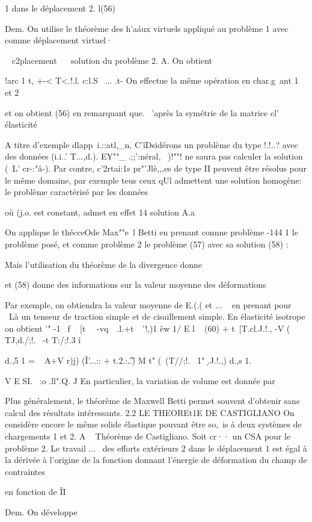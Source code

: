 {{{1 dans le déplacement 2. 
l(56) 


Dem. On utilise le théorème des h'a\'aux virtuels appliqué au problème 1 avec comme déplacement virtuel·}~ c2placement ~~ solution du problème 2. 
A. 
On obtient 

!arc 1 t,
+-< T<.!.l. c:l.S
\ ... .t-
On effectue la même opération en char.g~ant 1 et 2 

et on obtient (56) en remarquant que. ~'après la symétrie de la matrice cl' élasticité 

A titre d'exemple dlapp~i.::atl,_n, C'îDsidérons un problème du type !.!..? avec des données (i.i..' T...,d.). EY""_ .;;':néral, ~)!""! ne saura pas calculer la so­lution (~L' cr-:"â-). Par contre, c'2rtai:1s pr"'Jlè,,,es de type II peuvent être résolus pour le même domaine, par exemple teus ceux qUl admettent une solu­tion homogène: le problème caractérisé par les données 

où (j.o. est constant, admet en effet 14 solution 
A.a 

On applique le thécceO\e de Max""e\ l Betti en prenant connne problème 
-144 
1 le problème posé, et 	comme problème 2 le problème (57) avec sa solution 
(58) : 

Mais l'utilisation du théorème de la divergence donne 

et (58) donne des informations sur la valeur moyenne des déformations 

Par exemple, on obtiendra la valeur moyenne de E.(.( et ... ~ en prenant pour 

~Là un tenseur de traction simple et de cisaillement simple. En élasticité 
isotrope on obtient 
'" -1 ~f ~ [t~~ -vq~~.l.+t~~'!,)1 èw
1/ E l ~ 
(60) 	
+ t~[T.cl.J.!., -V ( TJ,d./;!.~ -t T:/;!.3 î} d.,5 1 = ~ A+V r)j) (Î'...:: + t.2.:\t..) M t" (\ (T//;!.~ 1" \d.J.!.,) d.,s 1. 

V E SI. ~:o .ll".Q. 	J 
En particulier, la variation de volume est donnée par 

Plus généralement, le 	théorème de Maxwell Betti permet souvent 
d'obtenir sans calcul 	des résultats intéressants. 
2.2 LE THEOREt1E DE CASTIGLIANO 
On considère encore le même solide élastique pouvant être so,~is à deux systèmes de chargements 1 et 2. 
A ~ 
Théorème de Castigliano. Soit cr·· un CSA pour le problème 2. Le travail 
...~ 
des efforts extérieurs 2 dans le déplacement 1 est égal à la dérivée à l'origine de la fonction donnant l'énergie de déformation du champ de 
contraintes 

en fonction de ÎI 

Dem. On développe 

}
